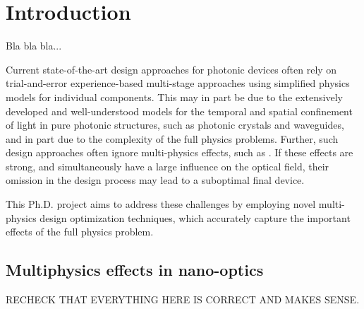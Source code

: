 \chapter{Introduction}

Bla bla bla...

Current state-of-the-art design approaches for photonic devices often rely on trial-and-error
experience-based multi-stage approaches using simplified physics models for individual
components. This may in part be due to the extensively developed and well-understood models
for the temporal and spatial confinement of light in pure photonic structures, such as photonic
crystals and waveguides, and in part due to the complexity of the full physics problems. Further, such design approaches often ignore multi-physics effects, such as . If these
effects are strong, and simultaneously have a large influence on the optical field, their omission in
the design process may lead to a suboptimal final device.

This Ph.D. project aims to address these challenges by employing novel
multi-physics design optimization techniques, which accurately capture 
the important effects of the full physics problem.






\section{Multiphysics effects in nano-optics}

RECHECK THAT EVERYTHING HERE IS CORRECT AND MAKES SENSE. 

